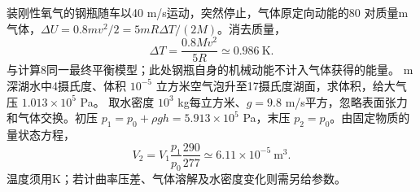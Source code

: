 \problemtext 装刚性氧气的钢瓶随车以40 m/s运动，突然停止，气体原定向动能的80%
\workings 对质量m气体，$\Delta U=0.8mv^2/2=5mR\Delta T/(2M)$。消去质量，
\[
\Delta T=\frac{0.8Mv^2}{5R}\simeq0.986\ \mathrm K .
\]
\crosscheck 与计算8同一最终平衡模型；此处钢瓶自身的机械动能不计入气体获得的能量。
 m深湖水中4摄氏度、体积 $10^{-5}$ 立方米空气泡升至17摄氏度湖面，求体积，给大气压 $1.013\times10^5$ Pa。
\workings 取水密度 $10^3$ kg每立方米、$g=9.8$ m/s平方，忽略表面张力和气体交换。初压 $p_1=p_0+\rho gh=5.913\times10^5$ Pa，末压 $p_2=p_0$。由固定物质的量状态方程，
\[
V_2=V_1\frac{p_1}{p_0}\frac{290}{277}\simeq6.11\times10^{-5}\ \mathrm{m^3}.
\]
\crosscheck 温度须用K；若计曲率压差、气体溶解及水密度变化则需另给参数。
